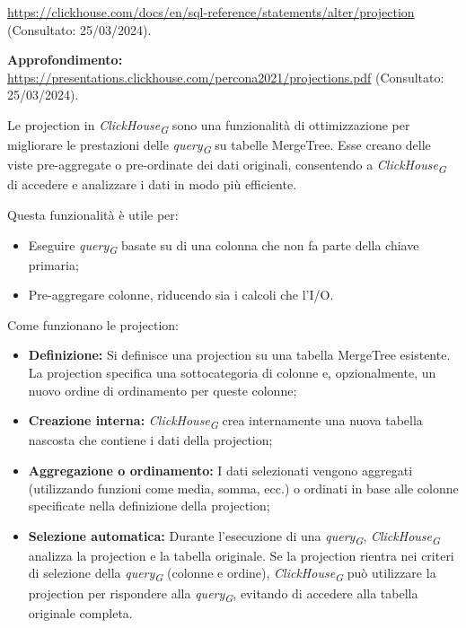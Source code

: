 \url{https://clickhouse.com/docs/en/sql-reference/statements/alter/projection} (Consultato: 25/03/2024).

\textbf{Approfondimento:} \url{https://presentations.clickhouse.com/percona2021/projections.pdf} (Consultato: 25/03/2024).

Le projection in \textit{ClickHouse}\textsubscript{\textit{G}} sono una funzionalità di ottimizzazione per migliorare le prestazioni delle \textit{query}\textsubscript{\textit{G}} su tabelle MergeTree. Esse creano delle viste pre-aggregate o pre-ordinate dei dati originali, consentendo a \textit{ClickHouse}\textsubscript{\textit{G}} di accedere e analizzare i dati in modo più efficiente.

Questa funzionalità è utile per:

\begin{itemize}
    \item Eseguire \textit{query}\textsubscript{\textit{G}} basate su di una colonna che non fa parte della chiave primaria;
    \item Pre-aggregare colonne, riducendo sia i calcoli che l'I/O.
\end{itemize}

Come funzionano le projection:
\begin{itemize}
	\item \textbf{Definizione:} Si definisce una projection su una tabella MergeTree esistente. La projection specifica una sottocategoria di colonne e, opzionalmente, un nuovo ordine di ordinamento per queste colonne;
	\item \textbf{Creazione interna:} \textit{ClickHouse}\textsubscript{\textit{G}} crea internamente una nuova tabella nascosta che contiene i dati della projection;
	\item \textbf{Aggregazione o ordinamento:} I dati selezionati vengono aggregati (utilizzando funzioni come media, somma, ecc.) o ordinati in base alle colonne specificate nella definizione della projection;
	\item \textbf{Selezione automatica:} Durante l'esecuzione di una \textit{query}\textsubscript{\textit{G}}, \textit{ClickHouse}\textsubscript{\textit{G}} analizza la projection e la tabella originale. Se la projection rientra nei criteri di selezione della \textit{query}\textsubscript{\textit{G}} (colonne e ordine), \textit{ClickHouse}\textsubscript{\textit{G}} può utilizzare la projection per rispondere alla \textit{query}\textsubscript{\textit{G}}, evitando di accedere alla tabella originale completa.
\end{itemize}

